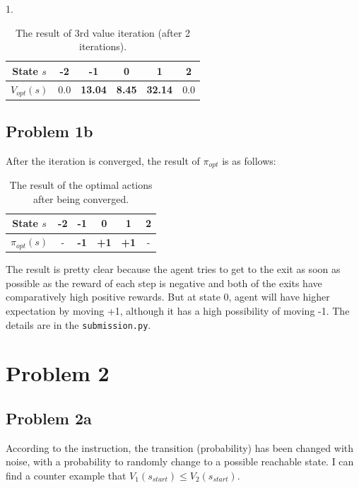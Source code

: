 \documentclass[paper=a4, fontsize=10pt]{scrartcl} %
\numberwithin{equation}{section} %
\numberwithin{figure}{section} %
\numberwithin{table}{section} %
\begin{document}
\begin{spacing}{1.}
\begin{table}[h]
\setlength{\abovecaptionskip}{0.cm}
\setlength{\belowcaptionskip}{-0.cm}
\centering
  \caption{The result of 3rd value iteration (after 2 iterations).}
  \begin{tabular}{|c|c|c|c|c|c|}
     \hline
    State $s$ & -2 & -1 & 0 & 1 & 2\\
     \hline
    $V_{opt}(s)$ & 0.0 & \textbf{13.04} & \textbf{8.45} & \textbf{32.14} & 0.0\\
     \hline
  \end{tabular}
\end{table}

\subsection{Problem 1b}
After the iteration is converged, the result of $\pi_{opt}$ is as follows:
\begin{table}[!htbp]
\setlength{\abovecaptionskip}{0.cm}
\setlength{\belowcaptionskip}{-0.cm}
\centering
  \caption{The result of the optimal actions after being converged.}
  \begin{tabular}{|c|c|c|c|c|c|}
     \hline
    State $s$ & -2 & -1 & 0 & 1 & 2\\
     \hline
    $\pi_{opt}(s)$ & - & \textbf{-1} & \textbf{+1} & \textbf{+1} & -\\
     \hline
  \end{tabular}
\end{table}

The result is pretty clear because the agent tries to get to the exit as soon as possible as the reward of each step is negative and both of the exits have comparatively high positive rewards. But at state 0, agent will have higher expectation by moving +1, although it has a high possibility of moving -1. The details are in the \texttt{submission.py}.

\section{Problem 2}
\subsection{Problem 2a}
According to the instruction, the transition (probability) has been changed with noise, with a probability to randomly change to a possible reachable state. I can find a counter example that $V_{1}(s_{start}) \le V_{2}(s_{start})$. 


\end{spacing}
\end{document}
